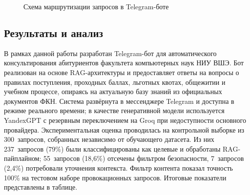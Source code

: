 \documentclass{article}
\begin{document}
\begin{figure}[H]
{%
}
\caption{Схема маршрутизации запросов в Telegram-боте}
\label{fig:bot_routing}
\end{figure}





\subsection{Результаты и анализ}

В рамках данной работы разработан Telegram-бот для автоматического консультирования абитуриентов факультета компьютерных наук НИУ ВШЭ. Бот реализован на основе RAG-архитектуры и предоставляет ответы на вопросы о правилах поступления, проходных баллах, льготных квотах, общежитии и учебном процессе, опираясь на актуальную базу знаний из официальных документов ФКН. Система развёрнута в мессенджере Telegram и доступна в режиме реального времени; в качестве генеративной модели используется YandexGPT с резервным переключением на Groq при недоступности основного провайдера. Экспериментальная оценка проводилась на контрольной выборке из 300~запросов, собранных независимо от обучающего датасета. Из них 237~запросов (79\%) были классифицированы как целевые и обработаны RAG-пайплайном; 55~запросов (18,6\%) отсечены фильтром безопасности, 7~запросов (2,4\%) потребовали уточнения контекста. Фильтр контента показал точность 100\% на тестовом наборе провокационных запросов. Итоговые показатели представлены в таблице. 
\end{document}
